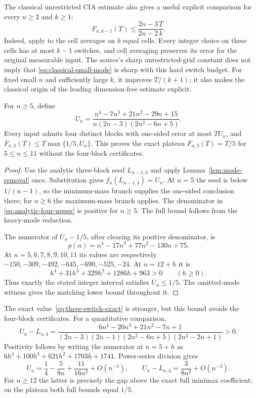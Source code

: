 The classical unrestricted CIA estimate also gives a useful explicit
comparison for every $n\ge2$ and $k\ge1$:
\begin{equation}\label{eq:classical-small-mode}
 F_{n,k-1}(T)\le\frac{2n-3}{2n-2}\frac{T}{k}.
\end{equation}
Indeed, apply \citet[Corollary~1, p.~669]{zeile2021dwell} to the cell averages
on $k$ equal cells. Every integer choice on these cells has at most $k-1$
switches, and cell averaging preserves its error for the original measurable
input. The source's sharp unrestricted-grid constant does not imply that
\eqref{eq:classical-small-mode} is sharp with this hard switch budget. For
fixed small $n$ and sufficiently large $k$, it improves $T/(k+1)$; it also
makes the classical origin of the leading dimension-free estimate explicit.

\begin{proposition}
\label{prop:analytic-four-upper}
For $n\ge5$, define
\begin{equation}\label{eq:analytic-four-upper}
 U_n=\frac{n^4-7n^3+21n^2-29n+15}
 {n(2n-3)(2n^2-6n+5)}.
\end{equation}
Every input admits four distinct blocks with one-sided error at most
$TU_n$, and $F_{n,3}(T)\le T\max\{1/5,U_n\}$.
This proves the exact plateau $F_{n,3}(T)=T/5$ for $5\le n\le11$
without the four-block certificates.
\end{proposition}
\begin{proof}
Use the analytic three-block seed $L_{n-1,3}$ and apply
Lemma~\ref{lem:mode-removal} once. Substitution gives
$f_n(L_{n-1,3})=U_n$. At $n=5$ the seed is below $1/(n-1)$,
so the minimum-mass branch supplies the one-sided conclusion there;
for $n\ge6$ the maximum-mass branch applies. The denominator in
\eqref{eq:analytic-four-upper} is positive for $n\ge5$.
The full bound follows from the heavy-mode reduction.

The numerator of $U_n-1/5$, after clearing its positive denominator, is
\[
 p(n)=n^4-17n^3+77n^2-130n+75.
\]
At $n=5,6,7,8,9,10,11$ its values are respectively
$-150,-309,-492,-645,-690,-525,-24$. At $n=12+h$ it is
\[
 h^4+31h^3+329h^2+1286h+963>0\qquad(h\ge0).
\]
Thus exactly the stated integer interval satisfies $U_n\le1/5$.
The omitted-mode witness gives the matching lower bound throughout it.
\end{proof}

The exact value~\eqref{eq:three-switch-exact} is stronger, but this bound
avoids the four-block certificates.
For a quantitative comparison,
\begin{equation}\label{eq:analytic-four-gap}
 U_n-L_{n,4}=
 \frac{6n^4-20n^3+21n^2-7n+1}
 {(2n-3)(2n-1)(2n^2-6n+5)(2n^2-2n+1)}>0.
\end{equation}
Positivity follows by writing the numerator at $n=5+h$ as
$6h^4+100h^3+621h^2+1703h+1741$. Power-series division gives
\[
 U_n=\frac14-\frac5{8n}+\frac{11}{16n^2}+O(n^{-3}),\qquad
 U_n-L_{n,4}=\frac3{8n^2}+O(n^{-3}).
\]
For $n\ge12$ the latter is precisely the gap above the exact full
minimax coefficient; on the plateau both full bounds equal $1/5$.

